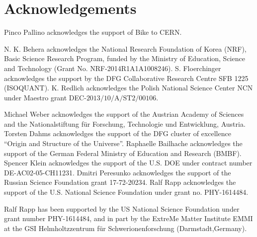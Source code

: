 \section*{Acknowledgements}


Pinco Pallino acknowledges the support of Bike to CERN.

N. K. Behera acknowledges the National Research Foundation of Korea (NRF), Basic Science Research Program, funded by the Ministry of Education, Science and Technology (Grant No. NRF-2014R1A1A1008246).
S. Floerchinger acknowledges the support by the DFG Collaborative Research Centre SFB 1225 (ISOQUANT). 
K. Redlich acknowledges the Polish National Science Center NCN under Maestro grant DEC-$\mathrm{2013/10/A/ST2/00106}$. 

Michael Weber acknowledges the support of the Austrian Academy of Sciences and the Nationalstiftung f\"ur Forschung, Technologie und Entwicklung, Austria.
Torsten Dahms acknowledges the support of the DFG cluster of excellence ``Origin and Structure of the Universe''. 
Raphaelle Bailhache acknowledges the support of the German Federal Ministry of Education and Research (BMBF).
Spencer Klein acknowledges the support of the U.S. DOE under contract number DE-AC02-05-CH11231.
Dmitri Peresunko acknowledges the support of the Russian Science Foundation grant 17-72-20234.
Ralf Rapp acknowledges the support of the U.S. National Science Foundation under
grant no. PHY-1614484.

Ralf Rapp has been supported by the US National Science Foundation under
grant number PHY-1614484, and in part by the ExtreMe Matter Institute EMMI at 
the GSI Helmholtzzentrum f\"{u}r Schwerionenforschung (Darmstadt,Germany).